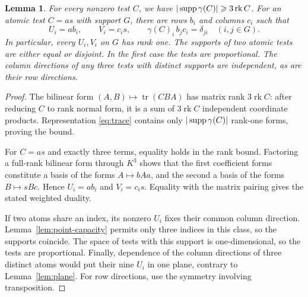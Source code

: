 \documentclass[11pt,a4paper]{article}
\numberwithin{equation}{section}
\theoremstyle{plain}
\newtheorem{lemma}[theorem]{Lemma}
\theoremstyle{definition}
\DeclareMathOperator{\tr}{tr}\DeclareMathOperator{\rk}{rk}
\begin{document}
\begin{lemma}\label{lem:atom}
For every nonzero test $C$, we have $|\supp\gamma(C)|\geqs3\rk C$.
For an atomic test $C=as$ with support $G$, there are rows $b_i$ and
columns $c_i$ such that
\[
 U_i=ab_i,\qquad V_i=c_i s,
 \qquad \gamma(C)_i\, b_jc_i=\delta_{ji}\quad(i,j\in G).
\]
In particular, every $U_i,V_i$ on $G$ has rank one.
The supports of two atomic tests are either equal or disjoint.
In the first case the tests are proportional. The column directions
of any three tests with distinct supports are independent, as are
their row directions.
\end{lemma}
\begin{proof}
The bilinear form $(A,B)\mapsto\tr(CBA)$ has matrix rank $3\rk C$:
after reducing $C$ to rank normal form, it is a sum of $3\rk C$
independent coordinate products. Representation \eqref{eq:trace}
contains only $|\operatorname{supp}\gamma(C)|$ rank-one forms, proving the bound.

For $C=as$ and exactly three terms, equality holds in the rank bound.
Factoring a full-rank bilinear form through $K^3$ shows that the
first coefficient forms constitute a basis of the forms $A\mapsto bAa$,
and the second a basis of the forms $B\mapsto sBc$.
Hence $U_i=ab_i$ and $V_i=c_i s$. Equality with the matrix pairing
gives the stated weighted duality.

If two atoms share an index, its nonzero $U_i$ fixes their common
column direction. Lemma~\ref{lem:point-capacity} permits only three
indices in this class, so the supports coincide. The space of tests
with this support is one-dimensional, so the tests are proportional.
Finally, dependence of the column directions of three distinct atoms
would put their nine $U_i$ in one plane, contrary to Lemma~\ref{lem:plane}.
For row directions, use the symmetry involving transposition.
\end{proof}
\end{document}
